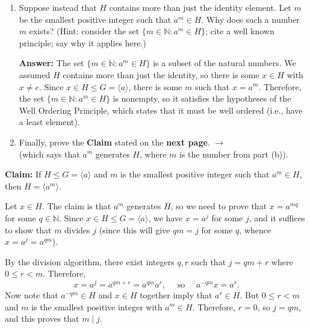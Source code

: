 \documentclass[12pt]{article}
\newcommand{\<}{\ensuremath{\langle}}
\renewcommand{\>}{\ensuremath{\rangle}}
\newcommand{\divides}{\ensuremath{\mid}}
\newcommand{\N}{\ensuremath{\mathbb{N}}}
\begin{document}
\begin{enumerate}[{\bf 1.}]
\begin{enumerate}
    \vskip1cm

  \item Suppose instead that $H$ contains more than just the identity element. 
    Let $m$ be the smallest positive integer such that $a^m\in H$.  
    Why does such a number $m$ exists? (Hint: consider the set 
    $\{m \in \N: a^m \in H\}$; cite a well known principle; say
    why it applies here.)

    \medskip

    {\bf Answer:} 
    The set $\{m \in \N: a^m \in H\}$ is a subset of the natural numbers.
    We assumed $H$ contains more than just the identity, so there is some 
    $x \in H$ with $x \neq e$.  Since $x \in H \leq G = \<a\>$, there is some
    $m$ such that $x = a^m$. Therefore, the set $\{m \in \N: a^m \in H\}$ is
    nonempty, so it satisfies the hypotheses of the Well Ordering Principle,
    which states that it must be well ordered (i.e., have a least element). 

    \vskip1cm

  \item Finally, prove the {\bf Claim} stated on the {\bf next page}. $\rightarrow$ \\
    (which says that $a^m$ generates $H$, where $m$ is the number from part (b)).
  \end{enumerate}

  \newpage
      {\bf Claim:} If $H\leq G = \<a\>$ and $m$ is the smallest positive integer such
      that $a^m \in H$, then $H = \<a^m\>$.

      \medskip

       Let $x \in H$.  The claim is that $a^m$ generates
      $H$, so we need to prove that $x = a^{mq}$ for some $q \in \N$.  
      Since $x \in H \leq G = \<a\>$, we have $x = a^j$ for some $j$, and it
      suffices to show that $m$ divides $j$
      (since this will give $qm = j$ for some $q$, whence
      $x= a^j = a^{qm}$).

      By the division algorithm, there exist integers $q, r$ such that 
      $j = qm + r$ where $0\leq r < m$.  Therefore, 
      \[
      x = a^j = a^{qm+r} = a^{qm}a^r, \quad \text{ so } \quad a^{-qm}x = a^r.
      \]
      Now note that $a^{-qm} \in H$ and $x \in H$ together imply that $a^r \in H$. 
      But $0\leq r < m$ and $m$ is the smallest positive integer with $a^m \in H$. 
      Therefore, $r = 0$, so $j = qm$, and this proves that $m\divides j$.


\end{enumerate}
\end{document}
